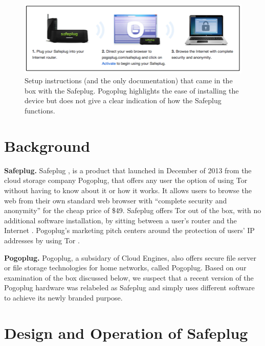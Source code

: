 \documentclass[letterpaper,twocolumn,10pt]{article}
\begin{document}
\begin{figure}
\centering
\includegraphics[width=.45\textwidth]{instructions2}
\caption{Setup instructions (and the only documentation) that came in the box with the Safeplug. Pogoplug highlights the ease of installing the device but does not give a clear indication of how the Safeplug functions.}
\label{fig:instructions}
\end{figure}  


\section{Background}
{\bf Safeplug.} Safeplug \cite{safeplug}, is a product that launched in December of 2013 from the cloud storage company Pogoplug, that offers any user the option of using Tor \cite{torproject} without having to know about it or how it works.  It allows users to browse the web from their own standard web browser with “complete security and anonymity” for the cheap price of \$49.  Safeplug offers Tor out of the box, with no additional software installation, by sitting between a user's router and the Internet \cite{wired}.  Pogoplug's marketing pitch centers around the protection of users' IP addresses by using Tor \cite{bittech}.

{\bf Pogoplug.} Pogoplug, a subsidary of Cloud Engines, also offers secure file server or file storage technologies for home networks, called Pogoplug.  Based on our examination of the box discussed below, we suspect that a recent version of the Pogoplug hardware was relabeled as Safeplug and simply uses different software to achieve its newly branded purpose.

\section{Design and Operation of Safeplug}
\end{document}
